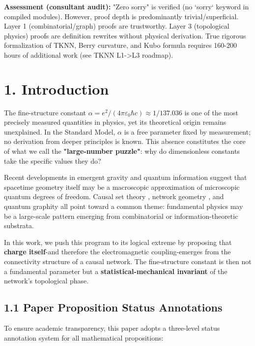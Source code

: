 \documentclass[11pt,a4paper]{article}
\theoremstyle{plain}
\theoremstyle{definition}
\begin{document}
\textbf{Assessment (consultant audit):} "Zero sorry" is verified (no `sorry` keyword in compiled modules). However, proof depth is predominantly trivial/superficial. Layer 1 (combinatorial/graph) proofs are trustworthy. Layer 3 (topological physics) proofs are definition rewrites without physical derivation. True rigorous formalization of TKNN, Berry curvature, and Kubo formula requires 160-200 hours of additional work (see TKNN L1->L3 roadmap).

\textemdash{}

\section{1. Introduction}

The fine-structure constant $\alpha = e^2 / (4\pi\varepsilon_0\hbar c) \approx 1/137.036$ is one of the most precisely measured quantities in physics, yet its theoretical origin remains unexplained. In the Standard Model, $\alpha$ is a free parameter fixed by measurement; no derivation from deeper principles is known. This absence constitutes the core of what we call the \textbf{"large-number puzzle"}: why do dimensionless constants take the specific values they do?

Recent developments in emergent gravity and quantum information suggest that spacetime geometry itself may be a macroscopic approximation of microscopic quantum degrees of freedom. Causal set theory \cite{Sorkin2005}, network geometry \cite{Bianconi2016}, and quantum graphity \cite{Konopka2008} all point toward a common theme: fundamental physics may be a large-scale pattern emerging from combinatorial or information-theoretic substrata.

In this work, we push this program to its logical extreme by proposing that \textbf{charge itself}-and therefore the electromagnetic coupling-emerges from the connectivity structure of a causal network. The fine-structure constant is then not a fundamental parameter but a \textbf{statistical-mechanical invariant} of the network's topological phase.

\textemdash{}

\subsection{1.1 Paper Proposition Status Annotations}

To ensure academic transparency, this paper adopts a three-level status annotation system for all mathematical propositions:
\end{document}

